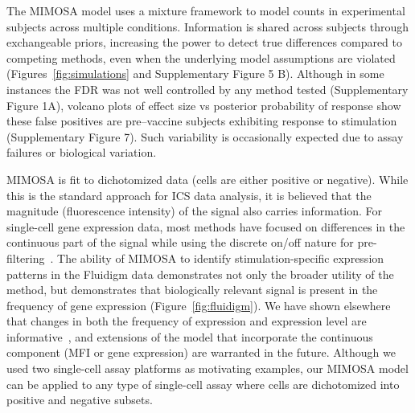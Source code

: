 \documentclass[12pt,oupdraft]{biostatistics}
\begin{document}
The MIMOSA model uses a mixture framework to model counts in experimental subjects across multiple conditions. Information is shared across subjects through exchangeable priors, increasing the power to detect true differences compared to competing methods, even when the underlying model assumptions are violated (Figures~\ref{fig:simulations} and Supplementary Figure 5 B). Although in some instances the FDR was not well controlled by any method tested (Supplementary Figure 1A), volcano plots of effect size vs posterior probability of response show these false positives are pre--vaccine subjects exhibiting response  to stimulation (Supplementary Figure 7). Such variability is occasionally expected due to assay failures or biological variation. 

MIMOSA is fit to dichotomized data  (cells are either positive or negative). While this is the standard approach for ICS data analysis, it is believed that the magnitude (fluorescence intensity) of the signal also carries information. For single-cell gene expression data, most methods have focused on differences in the continuous part of the signal while using the discrete on/off nature for pre-filtering~\citep{Flatz:2011jb}. 
The ability of MIMOSA to identify stimulation-specific expression patterns in the Fluidigm data demonstrates not only the broader utility of the method, but demonstrates that biologically relevant signal is present in the frequency of gene expression (Figure~\ref{fig:fluidigm}). 
We have shown elsewhere that changes in both the frequency of expression and expression level are informative~\citep{McDavid2012}, and extensions of the model that incorporate the continuous component (MFI or gene expression) are warranted in the future. 
Although we used two single-cell assay platforms as motivating examples, our MIMOSA model can be applied to any type of single-cell assay where cells are dichotomized into positive and negative subsets.

\end{document}
